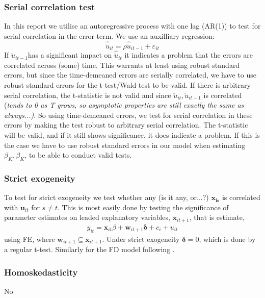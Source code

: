 \subsubsection*{Serial correlation test}
In this report we utilise an autoregressive process with one lag (AR(1)) to test for serial correlation in the error term. We use an auxilliary regression:
\begin{equation*}
    \hat{\ddot{u}}_{it}=\rho \hat{\ddot{u}}_{it-1}+\varepsilon_{it}
\end{equation*}
If $\hat{\ddot{u}}_{it-1}$has a significant impact on $\hat{\ddot{u}}_{it}$ it indicates a problem that the errors are correlated across (some) time. This warrants at least using robust standard errors, but since the time-demeaned errors are serially correlated, we have to use robust standard errors for the t-test/Wald-test to be valid. If there is arbitrary serial correlation, the t-statistic is not valid and since $\ddot{u}_{it},\ddot{u}_{it-1}$ is correlated (\textit{tends to 0 as T grows, so asymptotic properties are still exactly the same as always...)}. So using time-demeaned errors, we test for serial correlation in these errors by making the test robust to arbitrary serial correlation. The t-statistic will be valid, and if it still shows significance, it does indicate a problem. If this is the case we have to use robust standard errors in our model when estimating $\beta_K,\beta_K$, to be able to conduct valid tests.

\subsubsection*{Strict exogeneity}

To test for strict exogeneity we test whether any (is it any, or...?) $\bm{x_{is}}$ is correlated with $\bm{u}_{it}$ for $s \neq t$. This is most easily done by testing the significance of parameter estimates on leaded explanatory variables, $\bm{x}_{it+1}$, that is estimate, 
\begin{align*}
    y_{it} = \bm{x}_{it}\beta + \bm{w}_{it+1} \bm{\delta} + c_i + u_{it}
\end{align*} 
using FE, where $\bm{w}_{it+1} \subseteq \bm{x}_{it+1}$. Under strict exogeneity $\bm{\delta} = 0$, which is done by a regular t-test. Similarly for the FD model following \cite[Chapter~10]{wooldridgeEconometricAnalysisCross2010}. 

\subsubsection*{Homoskedasticity}
No
